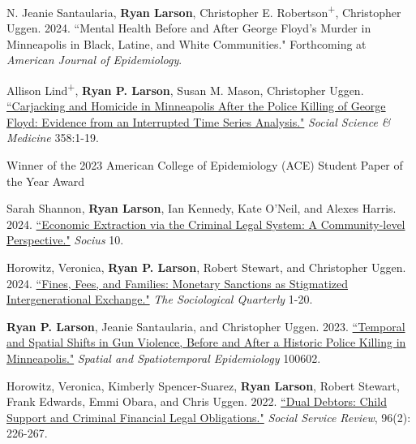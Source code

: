 \documentclass[letterpaper]{article}
\renewenvironment{itemize}{
  \begin{list}{}{
    \setlength{\leftmargin}{1.5em}
  }
}{
  \end{list}
}
\begin{document}
\begin{itemize}

\item N. Jeanie Santaularia, \textbf{Ryan Larson}, Christopher E. Robertson\textsuperscript{+}, Christopher Uggen. 2024. ``Mental Health Before and After George Floyd’s Murder in Minneapolis in Black, Latine, and White Communities." Forthcoming at \textit{American Journal of Epidemiology}.

\item Allison Lind\textsuperscript{+}, \textbf{Ryan P. Larson}, Susan M. Mason, Christopher Uggen. \href{https://ryanplarson.github.io/personal_site/pubs/lind_etal_24.pdf}{``Carjacking and Homicide in Minneapolis After the Police Killing of George Floyd:  Evidence from an Interrupted Time Series Analysis."} \textit{Social Science \& Medicine} 358:1-19.

\begin{itemize}
\item Winner of the 2023 American College of Epidemiology (ACE) Student Paper of the Year Award
\end{itemize}

\item Sarah Shannon, \textbf{Ryan Larson}, Ian Kennedy,  Kate O'Neil, and Alexes Harris. 2024. \href{https://ryanplarson.github.io/personal_site/pubs/shannon_etal_24.pdf}{``Economic Extraction via the Criminal Legal System: A Community-level Perspective."} \textit{Socius} 10. 

\item Horowitz, Veronica, \textbf{Ryan P. Larson}, Robert Stewart, and Christopher Uggen. 2024. \href{https://ryanplarson.github.io/personal_site/pubs/horowitz_etal_24.pdf}{``Fines, Fees, and Families: Monetary Sanctions as Stigmatized Intergenerational Exchange."} \textit{The Sociological Quarterly} 1-20.

\item \textbf{Ryan P. Larson}, Jeanie Santaularia, and Christopher Uggen. 2023. \href{https://ryanplarson.github.io/personal_site/pubs/larson_etal_23_online.pdf}{``Temporal and Spatial Shifts in Gun Violence, Before and After a Historic Police Killing in Minneapolis."} \textit{Spatial and Spatiotemporal Epidemiology} 100602.

\item Horowitz, Veronica, Kimberly Spencer-Suarez, \textbf{Ryan Larson}, Robert Stewart, Frank Edwards, Emmi Obara, and Chris Uggen. 2022. \href{https://ryanplarson.github.io/personal_site/pubs/horowitz_etal_22.pdf}{``Dual Debtors: Child Support and Criminal Financial Legal Obligations."} \textit{Social Service Review}, 96(2): 226-267.


\end{itemize}
\end{document}
